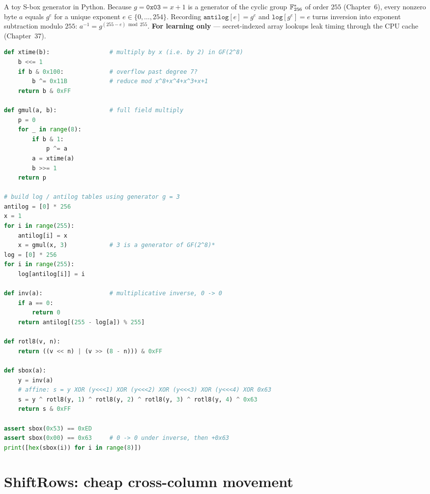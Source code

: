 \begin{implementbox}
A toy S-box generator in Python. Because $g = \mathtt{0x03} = x+1$ is a generator
of the cyclic group $\mathbb{F}_{256}^{*}$ of order $255$ (Chapter~6), every nonzero byte
$a$ equals $g^e$ for a unique exponent $e \in \{0,\dots,254\}$. Recording
$\texttt{antilog}[e] = g^e$ and $\texttt{log}[g^e] = e$ turns inversion into
exponent subtraction modulo $255$: $a^{-1} = g^{(255 - e) \bmod 255}$.
\textbf{For learning only} --- secret-indexed array lookups leak timing through the
CPU cache (Chapter~37).

\begin{lstlisting}[language=Python]
def xtime(b):                 # multiply by x (i.e. by 2) in GF(2^8)
    b <<= 1
    if b & 0x100:             # overflow past degree 7?
        b ^= 0x11B            # reduce mod x^8+x^4+x^3+x+1
    return b & 0xFF

def gmul(a, b):               # full field multiply
    p = 0
    for _ in range(8):
        if b & 1:
            p ^= a
        a = xtime(a)
        b >>= 1
    return p

# build log / antilog tables using generator g = 3
antilog = [0] * 256
x = 1
for i in range(255):
    antilog[i] = x
    x = gmul(x, 3)            # 3 is a generator of GF(2^8)*
log = [0] * 256
for i in range(255):
    log[antilog[i]] = i

def inv(a):                   # multiplicative inverse, 0 -> 0
    if a == 0:
        return 0
    return antilog[(255 - log[a]) % 255]

def rotl8(v, n):
    return ((v << n) | (v >> (8 - n))) & 0xFF

def sbox(a):
    y = inv(a)
    # affine: s = y XOR (y<<<1) XOR (y<<<2) XOR (y<<<3) XOR (y<<<4) XOR 0x63
    s = y ^ rotl8(y, 1) ^ rotl8(y, 2) ^ rotl8(y, 3) ^ rotl8(y, 4) ^ 0x63
    return s & 0xFF

assert sbox(0x53) == 0xED
assert sbox(0x00) == 0x63     # 0 -> 0 under inverse, then +0x63
print([hex(sbox(i)) for i in range(8)])
\end{lstlisting}
\end{implementbox}

\section{ShiftRows: cheap cross-column movement}
\label{ch12:shiftrows}

